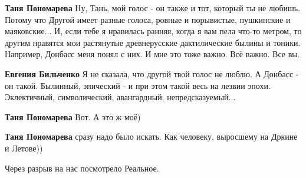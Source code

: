 \begin{itemize}
\begin{itemize}
\textbf{Таня Пономарева} Ну, Тань, мой голос - он также и тот, который ты не любишь. Потому что Другой имеет разные голоса, ровные и порывистые, пушкинские и маяковские... И, если тебе я нравилась ранняя, когда я вам пела что-то метром, то другим нравятся мои растянутые древнерусские дактилические былины и тоники. Например, Донбасс меня понял с них. И мне это тоже важно. Всё важно. Все вы.

 
\textbf{Евгения Бильченко} Я не сказала, что другой твой голос не люблю. А Донбасс - он такой. Былинный, эпический - и при этом такой весь на лезвии эпохи. Эклектичный, символический, авангардный, непредсказуемый...

 
\textbf{Таня Пономарева} Вот. А это ж моё)

 
\textbf{Таня Пономарева} сразу надо было искать. Как человеку, выросшему на Дркине и Летове))
\end{itemize}

 
Через разрыв на нас посмотрело Реальное.

\begin{itemize}
 

\end{itemize}
\end{itemize}
